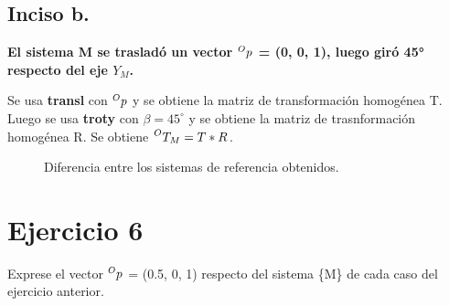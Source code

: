 \documentclass[a4paper,12pt]{article}
\begin{document}
\subsection{Inciso b.}
\textbf{El sistema {M} se trasladó un vector  $\prescript{O}{}{p}$ = (0, 0, 1), luego giró 45° respecto del eje $Y_M$.}
\vspace{0.5 cm}

Se usa \textbf{transl} con $\prescript{O}{}{p}$ y se obtiene la matriz de transformación homogénea T.
Luego se usa \textbf{troty} con $\beta = 45^\circ$ y se obtiene la matriz de trasnformación homogénea R.
Se obtiene $\prescript{O}{}{T_M} = T*R$.

\begin{figure}[H]
    \centering
    \begin{adjustbox}{scale = 0.85, max width=\columnwidth}
    \end{adjustbox}
    \caption{Diferencia entre los sistemas de referencia obtenidos.}
\end{figure}

\section{Ejercicio 6}
Exprese el vector $\prescript{O}{}{p}$ = (0.5, 0, 1) respecto del sistema \{M\} de cada caso del
ejercicio anterior.
\end{document}
